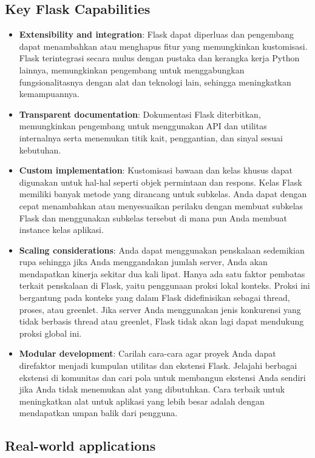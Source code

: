 \documentclass{article}
\begin{document}
\subsection{Key Flask Capabilities}
\begin{itemize}
    \item \textbf{Extensibility and integration}: Flask dapat diperluas dan pengembang dapat menambahkan atau menghapus fitur yang memungkinkan kustomisasi. Flask terintegrasi secara mulus dengan pustaka dan kerangka kerja Python lainnya, memungkinkan pengembang untuk menggabungkan fungsionalitasnya dengan alat dan teknologi lain, sehingga meningkatkan kemampuannya.
    \item \textbf{Transparent documentation}: Dokumentasi Flask diterbitkan, memungkinkan pengembang untuk menggunakan API dan utilitas internalnya serta menemukan titik kait, penggantian, dan sinyal sesuai kebutuhan.
    \item \textbf{Custom implementation}: Kustomisasi bawaan dan kelas khusus dapat digunakan untuk hal-hal seperti objek permintaan dan respons. Kelas Flask memiliki banyak metode yang dirancang untuk subkelas. Anda dapat dengan cepat menambahkan atau menyesuaikan perilaku dengan membuat subkelas Flask dan menggunakan subkelas tersebut di mana pun Anda membuat instance kelas aplikasi.
    \item \textbf{Scaling considerations}: Anda dapat menggunakan penskalaan sedemikian rupa sehingga jika Anda menggandakan jumlah server, Anda akan mendapatkan kinerja sekitar dua kali lipat. Hanya ada satu faktor pembatas terkait penskalaan di Flask, yaitu penggunaan proksi lokal konteks. Proksi ini bergantung pada konteks yang dalam Flask didefinisikan sebagai thread, proses, atau greenlet. Jika server Anda menggunakan jenis konkurensi yang tidak berbasis thread atau greenlet, Flask tidak akan lagi dapat mendukung proksi global ini.
    \item \textbf{Modular development}: Carilah cara-cara agar proyek Anda dapat direfaktor menjadi kumpulan utilitas dan ekstensi Flask. Jelajahi berbagai ekstensi di komunitas dan cari pola untuk membangun ekstensi Anda sendiri jika Anda tidak menemukan alat yang dibutuhkan. Cara terbaik untuk meningkatkan alat untuk aplikasi yang lebih besar adalah dengan mendapatkan umpan balik dari pengguna.
\end{itemize}

\subsection{Real-world applications}
\end{document}
